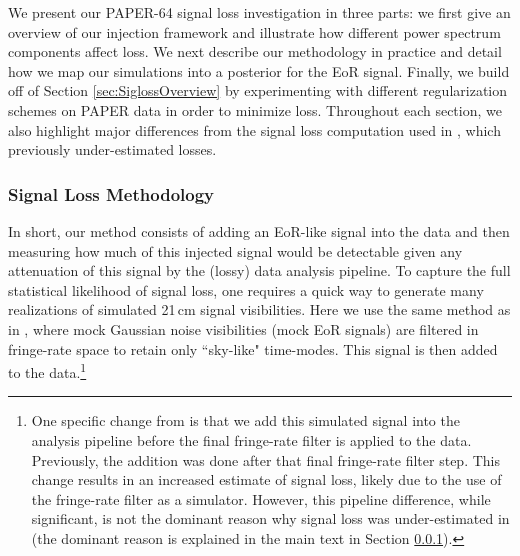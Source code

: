 \documentclass[preprint2,numberedappendix,tighten]{aastex6}  %
\begin{document}
We present our PAPER-64 signal loss investigation in three parts: we first give an overview of our injection framework and illustrate how different power spectrum components affect loss. We next describe our methodology in practice and detail how we map our simulations into a posterior for the EoR signal. Finally, we build off of Section \ref{sec:SiglossOverview} by experimenting with different regularization schemes on PAPER data in order to minimize loss. Throughout each section, we also highlight major differences from the signal loss computation used in , which previously under-estimated losses.


\subsubsection{Signal Loss Methodology} 
\label{sec:siglossmethod}
In short, our method consists of adding an EoR-like signal into the data and then measuring how much of this injected signal would be detectable given any attenuation of this signal by the (lossy) data analysis pipeline.  To capture the full statistical likelihood of signal loss, one requires a quick way to generate many realizations of simulated 21\,cm signal visibilities. Here we use the same method as in , where mock Gaussian noise visibilities (mock EoR signals) 
are filtered in fringe-rate space to retain only ``sky-like" time-modes. This signal is then added to the data.\footnote{One 
specific change from  is that we add this simulated signal into the analysis pipeline before the final fringe-rate filter is 
applied to the data. Previously, the addition was done after that final fringe-rate filter step.  This change results in an increased 
estimate of signal loss, %
likely due to the use of the fringe-rate filter as a simulator. However, this pipeline difference, while significant, is not the dominant reason why signal loss was under-estimated in  (the dominant reason is explained in the main text in Section \ref{sec:siglossmethod}).}
\end{document}
